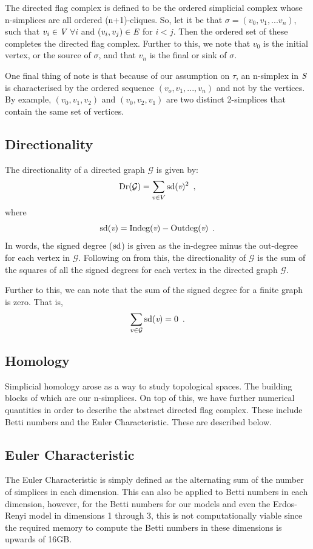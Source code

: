 The directed flag complex is defined to be the ordered simplicial complex whose n-simplices are all ordered (n+1)-cliques. So, let it be that $\sigma = (v_0, v_1, ...v_n)$, such that $v_i \in \emph{V}$ $\forall i$ and ($v_i, v_j) \in \emph{E}$ for $i < j$. Then the ordered set of these completes the directed flag complex. Further to this, we note that $v_0$ is the initial vertex, or the source of $\sigma$, and that $v_n$ is the final or sink of $\sigma$. 

One final thing of note is that because of our assumption on $\tau$, an n-simplex in $\emph{S}$ is characterised by the ordered sequence $(v_o, v_1, ..., v_n)$ and not by the vertices. By example, $(v_0, v_1, v_2)$ and $(v_0, v_2, v_1)$ are two distinct 2-simplices that contain the same set of vertices.

\subsection{Directionality}
The directionality \cite{Reimann_2017} of a directed graph $\mathcal{G}$ is given by:
\begin{equation}
    \text{Dr}(\mathcal{G}) = \sum_{v \in V} \text{sd}(\emph{v})^2 \enspace{,}
\end{equation}
where
\begin{equation}
    \text{sd}(\emph{v}) = \text{Indeg}(\emph{v}) - \text{Outdeg}(\emph{v})\enspace{.}
\end{equation}
In words, the signed degree ($\text{sd}$) is given as the in-degree minus the out-degree for each vertex in $\mathcal{G}$. Following on from this, the directionality of $\mathcal{G}$ is the sum of the squares of all the signed degrees for each vertex in the directed graph $\mathcal{G}$. 

Further to this, we can note that the sum of the signed degree for a finite graph is zero. That is,
\begin{equation}
    \sum_{v \in \mathcal{G}}\text{sd}(\emph{v}) = 0 \enspace{.}
\end{equation}
\subsection{Homology}
Simplicial homology arose as a way to study topological spaces. The building blocks of which are our n-simplices. On top of this, we have further numerical quantities in order to describe the abstract directed flag complex. These include Betti numbers and the Euler Characteristic. These are described below. 
\subsection{Euler Characteristic}
The Euler Characteristic is simply defined as the alternating sum of the number of simplices in each dimension. This can also be applied to Betti numbers in each dimension, however, for the Betti numbers for our models and even the Erdos-Renyi model in dimensions 1 through 3,  this is not computationally viable since the required memory to compute the Betti numbers in these dimensions is upwards of 16GB. 

